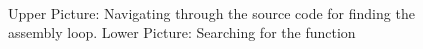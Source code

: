 \begin{figure}
   \\
\caption{Upper Picture: Navigating through the source code for finding the assembly loop.
         Lower Picture: Searching for the function  }
\label{figure34}
\end{figure}

